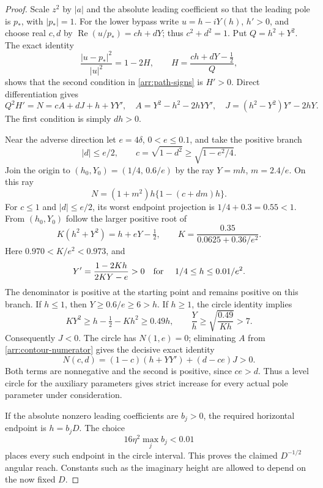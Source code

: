 \begin{proof}
Scale \(z^2\) by \(|a|\) and the absolute leading coefficient so that
the leading pole is \(p_*\), with \(|p_*|=1\).
For the lower bypass write \(u=h-iY(h)\), \(h'>0\), and choose real
\(c,d\) by
\(\operatorname{Re}(u/p_*)=ch+dY\); thus \(c^2+d^2=1\).
Put \(Q=h^2+Y^2\).  The exact identity
\[
 \frac{|u-p_*|^2}{|u|^2}
   =1-2H,\qquad H=\frac{ch+dY-\tfrac12}{Q},
\]
shows that the second condition in \eqref{arr:path-signs} is \(H'>0\).
Direct differentiation gives
\begin{equation}\label{arr:contour-numerator}
 Q^2H'=N=cA+dJ+h+YY',\quad
 A=Y^2-h^2-2hYY',\quad J=(h^2-Y^2)Y'-2hY.
\end{equation}
The first condition is simply \(dh>0\).

Near the adverse direction let \(e=4\delta\), \(0<e\le0.1\),
and take the positive branch
\[
 |d|\le e/2,\qquad c=\sqrt{1-d^2}\ge\sqrt{1-e^2/4}.
\]
Join the origin to
\((h_0,Y_0)=(1/4,\,0.6/e)\) by the ray \(Y=mh\),
\(m=2.4/e\).  On this ray
\[
 N=(1+m^2)h\{1-(c+dm)h\}.
\]
For \(c\le1\) and \(|d|\le e/2\), its worst endpoint projection is
\(1/4+0.3=0.55<1\).
From \((h_0,Y_0)\) follow the larger positive root of
\begin{equation}\label{arr:circle}
 K(h^2+Y^2)=h+eY-\tfrac12,\qquad
 K=\frac{0.35}{0.0625+0.36/e^2}.
\end{equation}
Here \(0.970<K/e^2<0.973\), and
\[
 Y'=\frac{1-2Kh}{2KY-e}>0
 \quad\hbox{for }\quad 1/4\le h\le0.01/e^2.
\]
The denominator is positive at the starting point and remains
positive on this branch.  If \(h\le1\), then \(Y\ge0.6/e\ge6>h\).
If \(h\ge1\), the circle identity implies
\[
 KY^2\ge h-\tfrac12-Kh^2\ge0.49h,\qquad
 \frac Yh\ge\sqrt{\frac{0.49}{Kh}}>7.
\]
Consequently \(J<0\).  The circle has \(N(1,e)=0\); eliminating \(A\)
from \eqref{arr:contour-numerator} gives the decisive exact identity
\begin{equation}\label{arr:circle-strict}
 N(c,d)=(1-c)(h+YY')+(d-ce)J>0.
\end{equation}
Both terms are nonnegative and the second is positive, since
\(ce>d\).  Thus a level circle for the auxiliary parameters gives
strict increase for every actual pole parameter under consideration.

If the absolute nonzero leading coefficients are \(b_j>0\), the
required horizontal endpoint is \(h=b_jD\).  The choice
\[
 16\eta^2\max_j b_j<0.01
\]
places every such endpoint in the circle interval.  This proves the
claimed \(D^{-1/2}\) angular reach.  Constants such as the imaginary
height are allowed to depend on the now fixed \(D\).


\end{proof}
